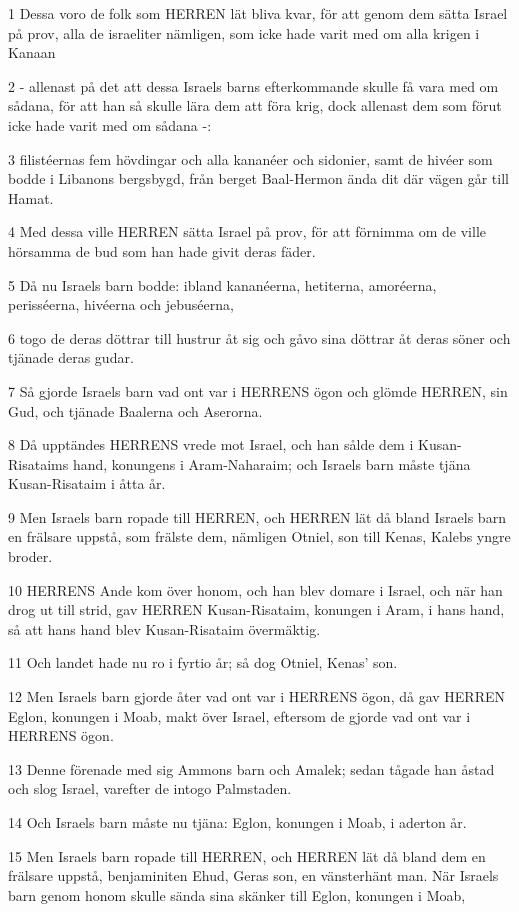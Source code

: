 \par 1 Dessa voro de folk som HERREN lät bliva kvar, för att genom dem sätta Israel på prov, alla de israeliter nämligen, som icke hade varit med om alla krigen i Kanaan
\par 2 - allenast på det att dessa Israels barns efterkommande skulle få vara med om sådana, för att han så skulle lära dem att föra krig, dock allenast dem som förut icke hade varit med om sådana -:
\par 3 filistéernas fem hövdingar och alla kananéer och sidonier, samt de hivéer som bodde i Libanons bergsbygd, från berget Baal-Hermon ända dit där vägen går till Hamat.
\par 4 Med dessa ville HERREN sätta Israel på prov, för att förnimma om de ville hörsamma de bud som han hade givit deras fäder.
\par 5 Då nu Israels barn bodde: ibland kananéerna, hetiterna, amoréerna, perisséerna, hivéerna och jebuséerna,
\par 6 togo de deras döttrar till hustrur åt sig och gåvo sina döttrar åt deras söner och tjänade deras gudar.
\par 7 Så gjorde Israels barn vad ont var i HERRENS ögon och glömde HERREN, sin Gud, och tjänade Baalerna och Aserorna.
\par 8 Då upptändes HERRENS vrede mot Israel, och han sålde dem i Kusan-Risataims hand, konungens i Aram-Naharaim; och Israels barn måste tjäna Kusan-Risataim i åtta år.
\par 9 Men Israels barn ropade till HERREN, och HERREN lät då bland Israels barn en frälsare uppstå, som frälste dem, nämligen Otniel, son till Kenas, Kalebs yngre broder.
\par 10 HERRENS Ande kom över honom, och han blev domare i Israel, och när han drog ut till strid, gav HERREN Kusan-Risataim, konungen i Aram, i hans hand, så att hans hand blev Kusan-Risataim övermäktig.
\par 11 Och landet hade nu ro i fyrtio år; så dog Otniel, Kenas' son.
\par 12 Men Israels barn gjorde åter vad ont var i HERRENS ögon, då gav HERREN Eglon, konungen i Moab, makt över Israel, eftersom de gjorde vad ont var i HERRENS ögon.
\par 13 Denne förenade med sig Ammons barn och Amalek; sedan tågade han åstad och slog Israel, varefter de intogo Palmstaden.
\par 14 Och Israels barn måste nu tjäna: Eglon, konungen i Moab, i aderton år.
\par 15 Men Israels barn ropade till HERREN, och HERREN lät då bland dem en frälsare uppstå, benjaminiten Ehud, Geras son, en vänsterhänt man. När Israels barn genom honom skulle sända sina skänker till Eglon, konungen i Moab,
